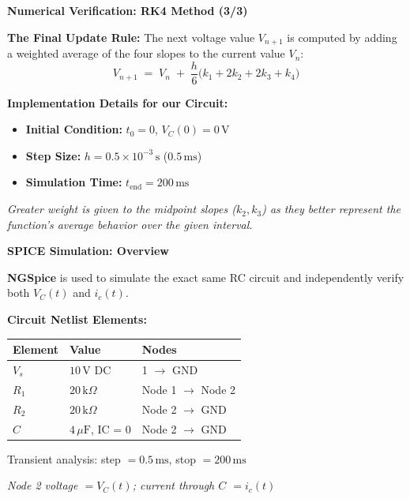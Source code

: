\documentclass[12pt]{beamer}
\begin{document}
\begin{frame}{\textbf{Numerical Verification: RK4 Method (3/3)}}
  \begin{center}
    \vfill
    \textbf{The Final Update Rule:}
    The next voltage value $V_{n+1}$ is computed by adding a weighted average of the four slopes to the current value $V_n$:
    \[
      V_{n+1} \;=\; V_n \;+\; \frac{h}{6}\bigl(k_1 + 2k_2 + 2k_3 + k_4\bigr)
    \]

    \vspace{1.5em}
    \textbf{Implementation Details for our Circuit:}
    \begin{itemize}
        \item \textbf{Initial Condition:} $t_0 = 0$, $V_C(0) = 0\,\mathrm{V}$
        \item \textbf{Step Size:} $h = 0.5 \times 10^{-3}\,\mathrm{s}$ ($0.5\,\mathrm{ms}$)
        \item \textbf{Simulation Time:} $t_{\text{end}} = 200\,\mathrm{ms}$
    \end{itemize}

    \vspace{1em}
    \normalsize\textit{Greater weight is given to the midpoint slopes ($k_2, k_3$) as they better represent the function's average behavior over the given interval.}
    \vfill
  \end{center}
\end{frame}

\begin{frame}{\textbf{SPICE Simulation: Overview}}
  \begin{center}
    \vfill
    \textbf{NGSpice} is used to simulate the exact same RC circuit
    and independently verify both $V_C(t)$ and $i_c(t)$.

    \vspace{1.5em}
    \textbf{Circuit Netlist Elements:}

    \vspace{0.8em}
    \begin{tabular}{lll}
      \textbf{Element} & \textbf{Value} & \textbf{Nodes} \\
      \hline
      $V_s$            & $10\,\mathrm{V}$ DC & 1 $\to$ GND \\
      $R_1$            & $20\,\mathrm{k}\Omega$ & Node 1 $\to$ Node 2 \\
      $R_2$            & $20\,\mathrm{k}\Omega$ & Node 2 $\to$ GND \\
      $C$              & $4\,\mu\mathrm{F}$, IC = 0 & Node 2 $\to$ GND \\
    \end{tabular}

    \vspace{1.5em}
    Transient analysis: step $= 0.5\,\mathrm{ms}$, stop $= 200\,\mathrm{ms}$

    \vspace{0.8em}
    \textit{Node 2 voltage $= V_C(t)$;\quad
    current through $C$ $= i_c(t)$}
    \vfill
  \end{center}
\end{frame}
\end{document}
